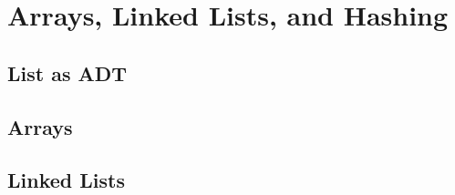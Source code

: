 \chapter{Arrays, Linked Lists, and Hashing}
\section{List as ADT}
\section{Arrays}
\section{Linked Lists}